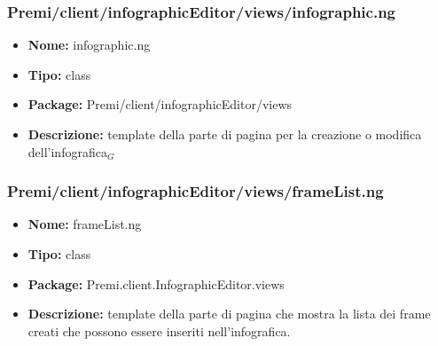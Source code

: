 \subsubsection{Premi/client/infographicEditor/views/infographic.ng}
\begin{itemize}
  \item[] \textbf{Nome:} infographic.ng
  \item[] \textbf{Tipo:} class
  \item[] \textbf{Package:} Premi/client/infographicEditor/views
  \item[] \textbf{Descrizione:}  template della parte di pagina per la creazione o modifica dell'infografica$_G$
\end{itemize}
\subsubsection{Premi/client/infographicEditor/views/frameList.ng}
\begin{itemize}
  \item[] \textbf{Nome:} frameList.ng
  \item[] \textbf{Tipo:} class
  \item[] \textbf{Package:} Premi.client.InfographicEditor.views
  \item[] \textbf{Descrizione:} template della parte di pagina che mostra la lista dei frame creati che possono essere inseriti nell'infografica.
\end{itemize}
